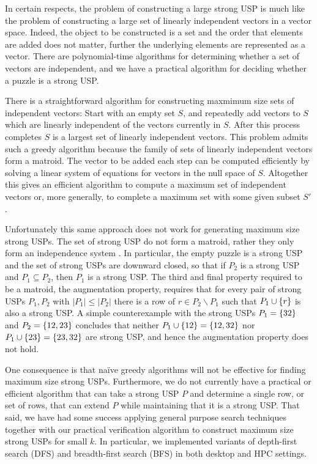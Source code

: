 \documentclass[11pt]{article}
\begin{document}
In certain respects, the problem of constructing a large strong USP is
much like the problem of constructing a large set of linearly
independent vectors in a vector space.  Indeed, the object to be
constructed is a set and the order that elements are added does not
matter, further the underlying elements are represented as a vector.
There are polynomial-time algorithms for determining whether a set of
vectors are independent, and we have a practical algorithm for
deciding whether a puzzle is a strong USP.

There is a straightforward algorithm for constructing maxmimum size
sets of independent vectors: Start with an empty set $S$, and
repeatedly add vectors to $S$ which are linearly independent of the
vectors currently in $S$.  After this process completes $S$ is a
largest set of linearly independent vectors.  This problem admits such
a greedy algorithm because the family of sets of linearly independent
vectors form a matroid.  The vector to be added each step can be
computed efficiently by solving a linear system of equations for
vectors in the null space of $S$.  Altogether this gives an efficient
algorithm to compute a maximum set of independent vectors or, more
generally, to complete a maximum set with some given subset $S'$.

Unfortunately this same approach does not work for generating maximum
size strong USPs.  The set of strong USP do not form a matroid, rather
they only form an independence system \cite{oxl06}.  In particular,
the empty puzzle is a strong USP and the set of strong USPs are
downward closed, so that if $P_2$ is a strong USP and $P_1 \subseteq
P_2$, then $P_1$ is a strong USP.  The third and final property
required to be a matroid, the augmentation property, requires that for
every pair of strong USPs $P_1, P_2$ with $|P_1| \le |P_2|$ there is a
row of $r \in P_2 \backslash P_1$ such that $P_1 \cup \left\{ r \right\}$ is also
a strong USP.  A simple counterexample with the strong USPs $P_1 =
\left\{ 32 \right\}$ and $P_2 = \left\{ 12, 23 \right\}$ concludes that neither $P_1 \cup
\left\{ 12 \right\} = \left\{ 12, 32 \right\}$ nor $P_1 \cup \left\{ 23 \right\} = \left\{ 23, 32 \right\}$ are
strong USP, and hence the augmentation property does not hold.

One consequence is that na\"{i}ve greedy algorithms will not be
effective for finding maximum size strong USPs.  Furthermore, we do
not currently have a practical or efficient algorithm that can take a
strong USP $P$ and determine a single row, or set of rows, that can
extend $P$ while maintaining that it is a strong USP. That said, we
have had some success applying general purpose search techniques
together with our practical verification algorithm to construct
maximum size strong USPs for small $k$.  In particular, we implemented
variants of depth-first search (DFS) and breadth-first search (BFS) in
both desktop and HPC settings.
\end{document}
